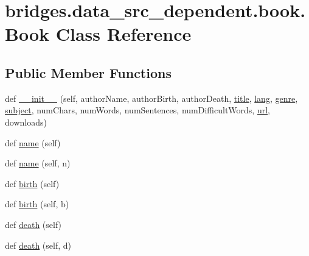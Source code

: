 \hypertarget{classbridges_1_1data__src__dependent_1_1book_1_1_book}{}\section{bridges.\+data\+\_\+src\+\_\+dependent.\+book.\+Book Class Reference}
\label{classbridges_1_1data__src__dependent_1_1book_1_1_book}
\subsection*{Public Member Functions}
\begin{DoxyCompactItemize}
\item 
def \mbox{\hyperlink{classbridges_1_1data__src__dependent_1_1book_1_1_book_aec4c365cdf13b6f90035e002e21ab448}{\+\_\+\+\_\+init\+\_\+\+\_\+}} (self, author\+Name, author\+Birth, author\+Death, \mbox{\hyperlink{classbridges_1_1data__src__dependent_1_1book_1_1_book_a62542e66172147fef8100c6acb410934}{title}}, \mbox{\hyperlink{classbridges_1_1data__src__dependent_1_1book_1_1_book_ab5c45b128634ba8f6c4e001a0c2dba59}{lang}}, \mbox{\hyperlink{classbridges_1_1data__src__dependent_1_1book_1_1_book_ad1be24582b2d609dba9aab8723c11e62}{genre}}, \mbox{\hyperlink{classbridges_1_1data__src__dependent_1_1book_1_1_book_a7d341f7c11e9debad855369b16ca705b}{subject}}, num\+Chars, num\+Words, num\+Sentences, num\+Difficult\+Words, \mbox{\hyperlink{classbridges_1_1data__src__dependent_1_1book_1_1_book_a22ff8b74af33e50a04d7f017b7cd8012}{url}}, downloads)
\item 
def \mbox{\hyperlink{classbridges_1_1data__src__dependent_1_1book_1_1_book_ae703b5475cd698e62e06d59baceed061}{name}} (self)
\item 
def \mbox{\hyperlink{classbridges_1_1data__src__dependent_1_1book_1_1_book_a80b43302d84f79c62b9b831e7d0cdd1e}{name}} (self, n)
\item 
def \mbox{\hyperlink{classbridges_1_1data__src__dependent_1_1book_1_1_book_a210c6ab89041e93f187fc25026b8b82d}{birth}} (self)
\item 
def \mbox{\hyperlink{classbridges_1_1data__src__dependent_1_1book_1_1_book_a049c19df2e16c01ba6ca007dbe7c42f1}{birth}} (self, b)
\item 
def \mbox{\hyperlink{classbridges_1_1data__src__dependent_1_1book_1_1_book_a5ff13b7ba521a7ebb67c0f539bb7fe37}{death}} (self)
\item 
def \mbox{\hyperlink{classbridges_1_1data__src__dependent_1_1book_1_1_book_ae3f2d7e7b80592c878d6793201fc8a0b}{death}} (self, d)

\end{DoxyCompactItemize}
